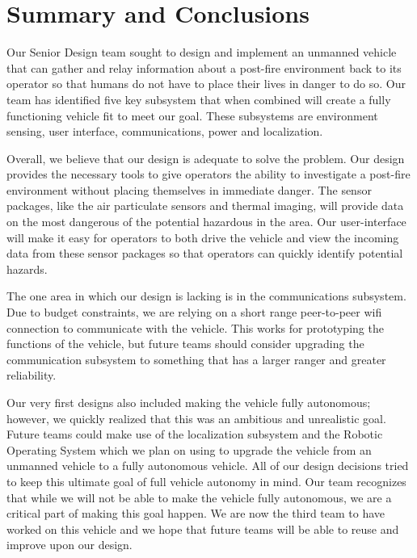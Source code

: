 \chapter{Summary and Conclusions}

Our Senior Design team sought to design and implement an unmanned vehicle that can gather and relay information about a post-fire environment back to its operator so that humans do not have to place their lives in danger to do so. Our team has identified five key subsystem that when combined will create a fully functioning vehicle fit to meet our goal.  These subsystems are environment sensing, user interface, communications, power and localization.

Overall, we believe that our design is adequate to solve the problem.  Our design provides the necessary tools to give operators the ability to investigate a post-fire environment without placing themselves in immediate danger.  The sensor packages, like the air particulate sensors and thermal imaging, will provide data on the most dangerous of the potential hazardous in the area.  Our user-interface will make it easy for operators to both drive the vehicle and view the incoming data from these sensor packages so that operators can quickly identify potential hazards.

The one area in which our design is lacking is in the communications subsystem.  Due to budget constraints, we are relying on a short range peer-to-peer wifi connection to communicate with the vehicle.  This works for prototyping the functions of the vehicle, but future teams should consider upgrading the communication subsystem to something that has a larger ranger and greater reliability.  

Our very first designs also included making the vehicle fully autonomous; however, we quickly realized that this was an ambitious and unrealistic goal.  Future teams could make use of the localization subsystem and the Robotic Operating System which we plan on using to upgrade the vehicle from an unmanned vehicle to a fully autonomous vehicle.  All of our design decisions tried to keep this ultimate goal of full vehicle autonomy in mind.  Our team recognizes that while we will not be able to make the vehicle fully autonomous, we are a critical part of making this goal happen. We are now the third team to have worked on this vehicle and we hope that future teams will be able to reuse and improve upon our design.


